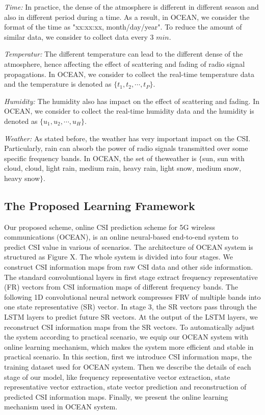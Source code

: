 \documentclass[10pt,journal,cspaper,compsoc]{IEEEtran}
\begin{document}
\textit{Time:} In practice, the dense of the atmosphere is different in different season and also in different period during a time. As a result, in OCEAN, we consider the format of the time as "xx:xx:xx, month/day/year". To reduce the amount of similar data, we consider to collect data every 3 $min$.

\textit{Temperatur:} The different temperature can lead to the different dense of the atmosphere, hence affecting the effect of scattering and fading of radio signal propagations. In OCEAN, we consider to collect the real-time temperature data and the temperature is denoted as $\{t_1, t_2, \cdots, t_{P}\}$.

\textit{Humidity:} The humidity also has impact on the effect of scattering and fading. In OCEAN, we consider to collect the real-time humidity data and the humidity is denoted as $\{u_1, u_2, \cdots, u_{H}\}$.

\textit{Weather:} As stated before, the weather has very important impact on the CSI. Particularly, rain can absorb the power of radio signals transmitted over some specific frequency bands. In OCEAN, the set of theweather is $\{$sun, sun with cloud, cloud, light rain, medium rain, heavy rain, light snow, medium snow, heavy snow$\}$.

\subsection{The Proposed Learning Framework}
\label{subsec:proposed-network}

Our proposed scheme, online CSI prediction scheme for 5G wireless communications (OCEAN), is an online neural-based end-to-end system to predict CSI value in various of scenarios. The architecture of OCEAN system is structured as Figure X. The whole system is divided into four stages. We construct CSI information maps from raw CSI data and other side information. The standard convoluntional layers in first stage extract frequency representative (FR) vectors from CSI information maps of different frequency bands. The following 1D convolutional neural network compresses FRV of multiple bands into one state representative (SR) vector. In stage 3, the SR vectors pass through the LSTM layers to predict future SR vectors. At the output of the LSTM layers, we reconstruct CSI information maps from the SR vectors. To automatically adjust the system according to practical scenario, we equip our OCEAN system with online learning mechanism, which makes the system more efficient and stable in practical scenario. In this section, first we introduce CSI information maps, the training dataset used for OCEAN system. Then  we describe the details of each stage of our model, like frequency representative vector extraction, state representative vector extraction, state vector prediction and reconstruction of predicted CSI information maps. Finally, we present the online learning mechanism used in OCEAN system.
\end{document}
